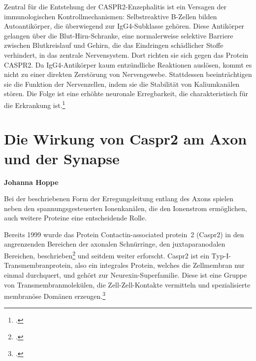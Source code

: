 \documentclass[a4paper, 12pt]{scrreprt}
\begin{document}
Zentral für die Entstehung der CASPR2-Enzephalitis ist ein Versagen der immunologischen Kontrollmechanismen: Selbstreaktive B-Zellen bilden Autoantikörper, die überwiegend zur IgG4-Subklasse gehören. Diese Antikörper gelangen über die Blut-Hirn-Schranke, eine normalerweise selektive Barriere zwischen Blutkreislauf und Gehirn, die das Eindringen schädlicher Stoffe verhindert, in das zentrale Nervensystem. Dort richten sie sich gegen das Protein CASPR2. Da IgG4-Antikörper kaum entzündliche Reaktionen auslösen, kommt es nicht zu einer direkten Zerstörung von Nervengewebe. Stattdessen beeinträchtigen sie die Funktion der Nervenzellen, indem sie die Stabilität von Kaliumkanälen stören. Die Folge ist eine erhöhte neuronale Erregbarkeit, die charakteristisch für die Erkrankung ist.\footcite{Patterson2018}
        
        
        
\chapter{Die Wirkung von Caspr2 am Axon und der Synapse}
\textbf{Johanna Hoppe}

Bei der beschriebenen Form der Erregungsleitung entlang des Axons
spielen neben den spannungsgesteuerten Ionenkanälen, die den Ionenstrom
ermöglichen, auch weitere Proteine eine entscheidende Rolle.

Bereits 1999 wurde das Protein Contactin-associated
protein~2 (Caspr2) in den angrenzenden Bereichen der axonalen Schnürringe, den
juxtaparanodalen Bereichen,
beschrieben\footcite{Poliak1999} und seitdem weiter erforscht. Caspr2
ist ein Typ-I-Transmembranprotein, also ein integrales Protein, welches
die Zellmembran nur einmal durchquert, und gehört zur
Neurexin-Superfamilie. Diese ist eine Gruppe von
Transmembranmolekülen, die Zell-Zell-Kontakte vermitteln und
spezialisierte membranöse Domänen
erzeugen.\footcites{HaklaiTopper2010}{CellSignaling2026}
\end{document}
